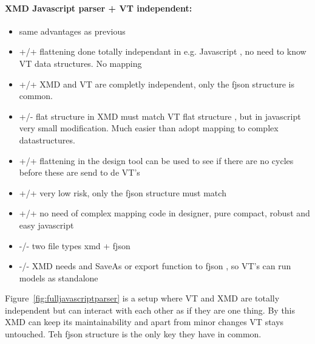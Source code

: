 \documentclass[a4paper,11pt,final]{article}
\begin{document}
\paragraph{XMD Javascript parser + VT independent:}
\begin{itemize}
\item same advantages as previous
\item +/+ flattening done totally independant in e.g. Javascript , no need to know VT data structures.  No mapping
\item +/+ XMD and VT are completly independent, only the fjson structure is common.
\item +/- flat structure in XMD must match VT flat structure , but in javascript
	very small modification. Much easier than adopt mapping to complex datastructures.
\item +/+ flattening in the design tool can be used to see if there are no cycles before these are send to de VT’s
\item +/+ very low risk, only the fjson structure must match
\item +/+ no need of complex mapping code in designer, pure compact, robust and easy javascript
\item -/- two file types xmd + fjson
\item -/- XMD needs and SaveAs or export function to fjson , so VT’s can run models as standalone
\end{itemize}


Figure~\ref{fig:fulljavascriptparser} is a setup where VT and XMD are totally independent
but can interact with each other as if they are one thing. By this XMD can keep
its maintainability and apart from minor changes VT stays untouched.
Teh fjson structure is the only key they have in common.
\end{document}
